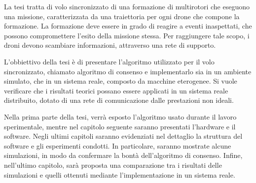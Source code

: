 
La tesi tratta di volo sincronizzato di una formazione di multirotori che eseguono una missione,
caratterizzata da una traiettoria per ogni drone che compone la formazione.
La formazione deve essere in grado di reagire a eventi inaspettati, che possono
compromettere l'esito della missione stessa.
Per raggiungere tale scopo, i droni devono scambiare informazioni, attraverso
una rete di supporto.

L'obbiettivo della tesi è di presentare l'algoritmo utilizzato per il volo sincronizzato,
chiamato algoritmo di consenso e implementarlo sia in un ambiente simulato,
che in un sistema reale, composto da macchine eterogenee. Si vuole verificare che
i risultati teorici possano essere applicati in un sistema reale distribuito, dotato di
una rete di comunicazione dalle prestazioni non ideali.

Nella prima parte della tesi, verrà esposto l'algoritmo usato durante il lavoro sperimentale,
mentre nel capitolo seguente saranno presentati l'hardware e il software.
Negli ultimi capitoli saranno evidenziati nel dettaglio la struttura del software
e gli esperimenti condotti.
In particolare, saranno mostrate alcune simulazioni, in modo da confermare la bontà
dell'algoritmo di consenso.
Infine, nell'ultimo capitolo, sarà proposta una comparazione tra i risultati
delle simulazioni e quelli ottenuti mediante l'implementazione in un sistema reale.
